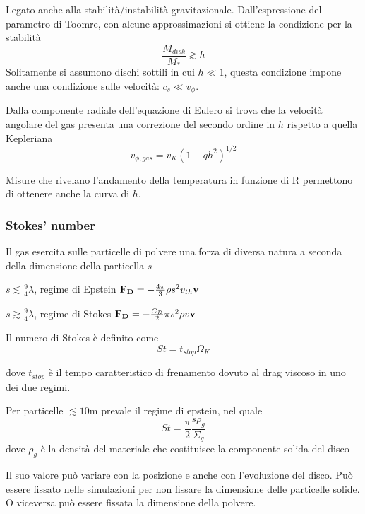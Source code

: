 \documentclass[DIN, pagenumber=false, fontsize=11pt, parskip=half]{scrartcl}
\begin{document}
Legato anche alla stabilità/instabilità gravitazionale. Dall'espressione del parametro di Toomre, con alcune approssimazioni si ottiene la condizione per la stabilità
\begin{equation}
\frac{M_{disk}}{M_*} \gtrsim h
\end{equation}
Solitamente si assumono dischi sottili in cui $h \ll 1$, questa condizione impone anche una condizione sulle velocità: $c_s \ll v_\phi$.

Dalla componente radiale dell'equazione di Eulero si trova che la velocità angolare del gas presenta una correzione del secondo ordine in $h$ rispetto a quella Kepleriana
\begin{equation}
v_{\phi, gas} = v_K(1-qh^2)^{1/2}
\end{equation}

Misure che rivelano l'andamento della temperatura in funzione di R permettono di ottenere anche la curva di $h$.

\subsubsection{Stokes' number}
\label{stnum}
Il gas esercita sulle particelle di polvere una forza di diversa natura a seconda della dimensione della particella $s$

$s \lesssim \frac94 \lambda$, regime di Epstein $\bold{F_D} = -\frac{4\pi}3 \rho s^2 v_{th} \bold{v}$

$s \gtrsim \frac94 \lambda$, regime di Stokes $\bold{F_D} = -\frac{C_D}2 \pi s^2 \rho v \bold{v}$

Il numero di Stokes è definito come 
\begin{equation}
St = t_{stop}\Omega_K
\end{equation}

dove $t_{stop}$  è il tempo caratteristico di frenamento dovuto al drag viscoso in uno dei due regimi.

Per particelle $\lesssim 10\text{m}$ prevale il regime di epstein, nel quale
\begin{equation}
St = \frac\pi2 \frac{s\rho_g}{\Sigma_g}
\end{equation}
dove $\rho_g$  è la densità del materiale che costituisce la componente solida del disco

Il suo valore può variare con la posizione e anche con l'evoluzione del disco. 
Può essere fissato nelle simulazioni per non fissare la dimensione delle particelle solide. O viceversa può essere fissata la dimensione della polvere.
\end{document}
